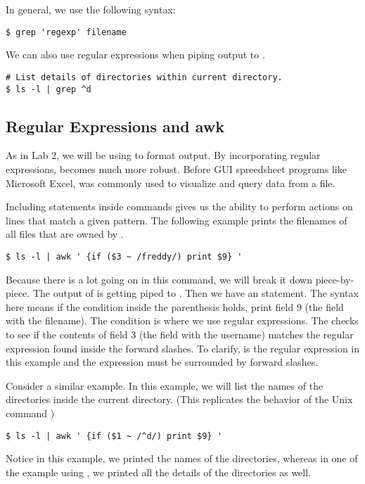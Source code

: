 In general, we use the following syntax:
\begin{lstlisting}
$ grep 'regexp' filename
\end{lstlisting}

We can also use regular expressions when piping output to .
\begin{lstlisting}
# List details of directories within current directory.
$ ls -l | grep ^d
\end{lstlisting}

\subsection*{Regular Expressions and awk}
As in Lab 2, we will be using  to format output. By incorporating regular expressions,  becomes much more robust. Before GUI spreedsheet programs like Microsoft Excel,  was commonly used to visualize and query data from a file.

Including  statements inside  commands gives us the ability to perform actions on lines that match a given pattern. The following example prints the filenames of all files that are owned by .
\begin{lstlisting}
$ ls -l | awk ' {if ($3 ~ /freddy/) print $9} '
\end{lstlisting}

Because there is a lot going on in this command, we will break it down piece-by-piece. The output of  is getting piped to . Then we have an  statement. The syntax here means if the condition inside the parenthesis holds, print field $9$ (the field with the filename). The condition is where we use regular expressions. The \li{\~} checks to see if the contents of field $3$ (the field with the username) matches the regular expression found inside the forward slashes. To clarify,  is the regular expression in this example and the expression must be surrounded by forward slashes.

Consider a similar example. In this example, we will list the names of the directories inside the current directory. (This replicates the behavior of the Unix command )

\begin{lstlisting}
$ ls -l | awk ' {if ($1 ~ /^d/) print $9} '
\end{lstlisting}

Notice in this example, we printed the names of the directories, whereas in one of the example using , we printed all the details of the directories as well.

